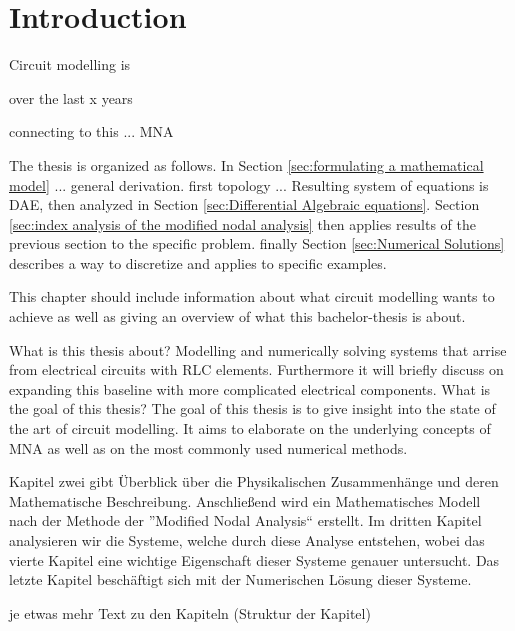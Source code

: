 \chapter{Introduction}

	Circuit modelling is
	
	over the last x years
	
	connecting to this ... MNA 
	
	
	
	The thesis is organized as follows. In Section \ref{sec:formulating a mathematical model} ... general derivation. first topology ... Resulting system of equations is DAE, then analyzed in Section \ref{sec:Differential Algebraic equations}. Section \ref{sec:index analysis of the modified nodal analysis} then applies results of the previous section to the specific problem. finally Section \ref{sec:Numerical Solutions} describes a way to discretize and applies to specific examples.




	This chapter should include information about what circuit modelling wants to achieve as well as giving an overview of what this bachelor-thesis is about.

What is this thesis about? \newline
	Modelling and numerically solving systems that arrise from electrical circuits with RLC elements. Furthermore it will briefly discuss on expanding this baseline with more complicated electrical components.
What is the goal of this thesis?\newline
	The goal of this thesis is to give insight into the state of the art of circuit modelling. It aims to elaborate on the underlying concepts of MNA as well as on the most commonly used numerical methods.
	
	Kapitel zwei gibt Überblick über die Physikalischen Zusammenhänge und deren Mathematische Beschreibung. Anschließend wird ein Mathematisches Modell nach der Methode der ''Modified Nodal Analysis`` erstellt. Im dritten Kapitel analysieren wir die Systeme, welche durch diese Analyse entstehen, wobei das vierte Kapitel eine wichtige Eigenschaft dieser Systeme genauer untersucht. Das letzte Kapitel beschäftigt sich mit der Numerischen Lösung dieser Systeme.  
	
	je etwas mehr Text zu den Kapiteln (Struktur der Kapitel)